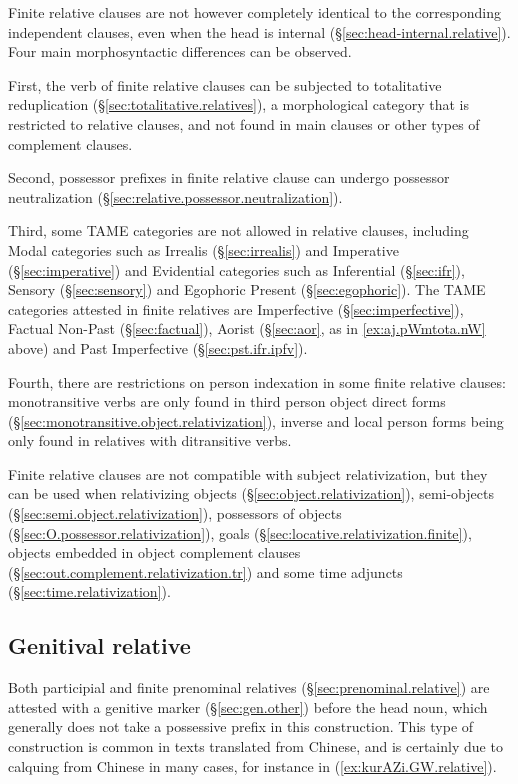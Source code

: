 Finite relative clauses are not however completely identical to the corresponding independent clauses, even when the head is internal (§\ref{sec:head-internal.relative}). Four main morphosyntactic differences can be observed.

First, the verb of finite relative clauses can be subjected to totalitative reduplication (§\ref{sec:totalitative.relatives}), a morphological category that is restricted to relative clauses, and not found in main clauses or other types of complement clauses.

Second, possessor prefixes in finite relative clause can undergo possessor neutralization (§\ref{sec:relative.possessor.neutralization}).

Third, some TAME categories are not allowed in relative clauses, including Modal categories such as Irrealis (§\ref{sec:irrealis}) and Imperative (§\ref{sec:imperative}) and Evidential categories such as Inferential (§\ref{sec:ifr}), Sensory (§\ref{sec:sensory}) and Egophoric Present (§\ref{sec:egophoric}). The TAME categories attested in finite relatives are Imperfective (§\ref{sec:imperfective}), Factual Non-Past (§\ref{sec:factual}), Aorist (§\ref{sec:aor}, as in \ref{ex:aj.pWmtota.nW} above) and Past Imperfective (§\ref{sec:pst.ifr.ipfv}).

Fourth, there are restrictions on person indexation in some finite relative clauses: monotransitive verbs are only found in third person object direct forms (§\ref{sec:monotransitive.object.relativization}), inverse and local person forms being only found in relatives with ditransitive verbs.

Finite relative clauses are not compatible with subject relativization, but they can be used when relativizing objects (§\ref{sec:object.relativization}), semi-objects (§\ref{sec:semi.object.relativization}), possessors of objects (§\ref{sec:O.possessor.relativization}), goals (§\ref{sec:locative.relativization.finite}), objects embedded in object complement clauses (§\ref{sec:out.complement.relativization.tr}) and some time adjuncts (§\ref{sec:time.relativization}).

\subsection{Genitival relative} \label{sec:genitival.relatives}
Both participial and finite prenominal relatives (§\ref{sec:prenominal.relative}) are attested with a genitive marker  (§\ref{sec:gen.other}) before the head noun, which generally does not take a possessive prefix in this construction. This type of construction is common in texts translated from Chinese, and is certainly due to calquing from Chinese in many cases, for instance in (\ref{ex:kurAZi.GW.relative}).  

